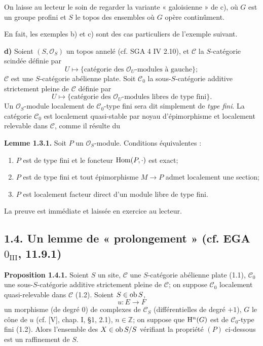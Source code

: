 \documentclass[11pt]{article}
\begin{document}
On laisse au lecteur le soin de regarder la variante « galoisienne » de c), où \(G\) est un groupe profini et \(S\) le topos des ensembles où \(G\) opère continûment.

En fait, les exemples b) et c) sont des cas particuliers de l'exemple suivant.

\textbf{d)} Soient \((S,\mathcal O_S)\) un topos annelé (cf. SGA 4 IV 2.10), et \(\mathcal C\) la \(S\)-catégorie scindée définie par
\[
  U\longmapsto\{\text{catégorie des }\mathcal O_U\text{-modules à gauche}\};
\]
\(\mathcal C\) est une \(S\)-catégorie abélienne plate. Soit \(\mathcal C_0\) la sous-\(S\)-catégorie additive strictement pleine de \(\mathcal C\) définie par
\[
  U\longmapsto\{\text{catégorie des }\mathcal O_U\text{-modules libres de type fini}\}.
\]
Un \(\mathcal O_S\)-module localement de \(\mathcal C_0\)-type fini sera dit simplement de \emph{type fini}. La catégorie \(\mathcal C_0\) est localement quasi-stable par noyau d'épimorphisme et localement relevable dans \(\mathcal C\), comme il résulte du

\textbf{Lemme 1.3.1.} Soit \(P\) un \(\mathcal O_S\)-module. Conditions équivalentes :
\begin{enumerate}[label=(\roman*)]
\item \(P\) est de type fini et le foncteur \(\operatorname{Hom}(P,\cdot)\) est exact;
\item \(P\) est de type fini et tout épimorphisme \(M\to P\) admet localement une section;
\item \(P\) est localement facteur direct d'un module libre de type fini.
\end{enumerate}
La preuve est immédiate et laissée en exercice au lecteur.

\subsection*{1.4. Un lemme de « prolongement » (cf. EGA \(0_{\mathrm{III}}\), 11.9.1)}

\textbf{Proposition 1.4.1.} Soient \(S\) un site, \(\mathcal C\) une \(S\)-catégorie abélienne plate (1.1), \(\mathcal C_0\) une sous-\(S\)-catégorie additive strictement pleine de \(\mathcal C\); on suppose \(\mathcal C_0\) localement quasi-relevable dans \(\mathcal C\) (1.2). Soient \(S\in\operatorname{ob} S\),
\[
  u:E\longrightarrow F
\]
un morphisme (de degré \(0\)) de complexes de \(\mathcal C_S\) (différentielles de degré \(+1\)), \(G\) le cône de \(u\) (cf. [V], chap. I, §1, 2.1), \(n\in\mathbb Z\); on suppose que \(\mathrm H^n(G)\) est de \(\mathcal C_0\)-type fini (1.2). Alors l'ensemble des \(X\in\operatorname{ob} S/S\) vérifiant la propriété \((P)\) ci-dessous est un raffinement de \(S\).
\end{document}

